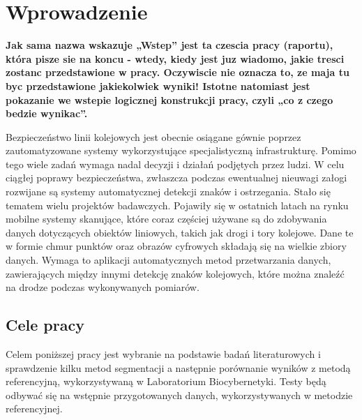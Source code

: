 \chapter{Wprowadzenie}
\label{cha:wprowadzenie}

\textbf{Jak sama nazwa wskazuje „Wstep” jest ta czescia pracy (raportu), która pisze sie na koncu -
wtedy, kiedy jest juz wiadomo, jakie tresci zostanc przedstawione w pracy. Oczywiscie nie
oznacza to, ze maja tu byc przedstawione jakiekolwiek wyniki! Istotne natomiast jest
pokazanie we wstepie logicznej konstrukcji pracy, czyli „co z czego bedzie wynikac”.}

Bezpieczeństwo linii kolejowych jest obecnie osiągane gównie poprzez zautomatyzowane systemy wykorzystujące specjalistyczną infrastrukturę. Pomimo tego wiele zadań wymaga nadal decyzji i działań podjętych przez ludzi. W celu ciągłej poprawy bezpieczeństwa, zwłaszcza podczas ewentualnej nieuwagi załogi rozwijane są systemy automatycznej detekcji znaków i ostrzegania. Stało się tematem wielu projektów badawczych. Pojawiły się w ostatnich latach na rynku mobilne systemy skanujące, które coraz częściej używane są do zdobywania danych dotyczących obiektów liniowych, takich jak drogi i tory kolejowe. Dane te w formie chmur punktów oraz obrazów cyfrowych składają się na wielkie zbiory danych. Wymaga to aplikacji automatycznych metod przetwarzania danych, zawierających między innymi detekcję znaków kolejowych, które można znaleźć na drodze podczas wykonywanych pomiarów.


\section{Cele pracy}
\label{sec:celePracy}

Celem poniższej pracy jest wybranie na podstawie badań literaturowych i sprawdzenie kilku metod segmentacji a następnie porównanie wyników z metodą referencyjną, wykorzystywaną w Laboratorium Biocybernetyki. Testy będą odbywać się na wstępnie przygotowanych danych, wykorzystywanych w metodzie referencyjnej.



